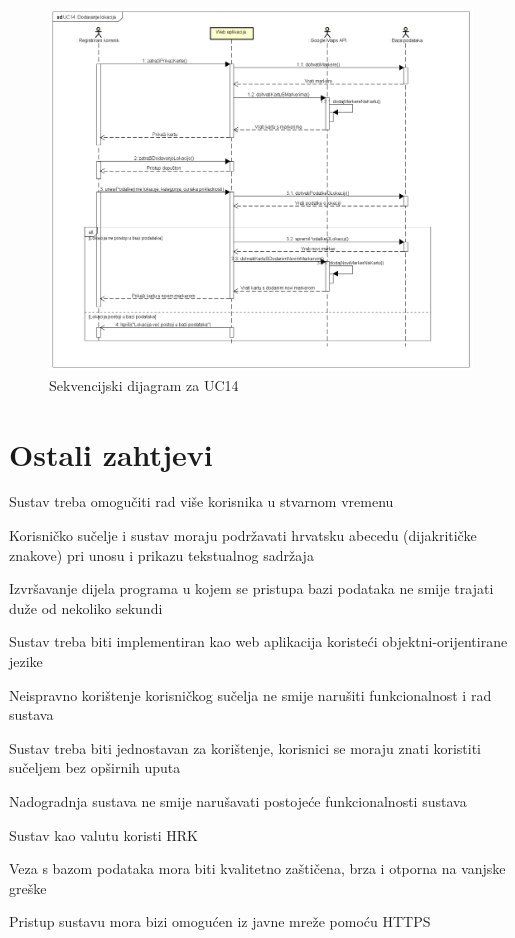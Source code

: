 				\begin{figure}[H]
					\includegraphics[scale=0.43]{slike/SekvencijskiDijagram2.png}
					\centering
					\caption{Sekvencijski dijagram za UC14}
					\label{fig:promjene}
				\end{figure}
				\eject
	
		\section{Ostali zahtjevi}
		
			\begin{packed_item}
	
        	\item  Sustav treba omogučiti rad više korisnika u stvarnom vremenu
        	\item  Korisničko sučelje i sustav moraju podržavati hrvatsku abecedu (dijakritičke znakove) pri unosu i prikazu tekstualnog sadržaja
        	\item  Izvršavanje dijela programa u kojem se pristupa bazi podataka ne smije trajati duže od nekoliko sekundi
            \item  Sustav treba biti implementiran kao web aplikacija koristeći objektni-orijentirane jezike
            \item Neispravno korištenje korisničkog sučelja ne smije narušiti funkcionalnost i rad sustava
            \item Sustav treba biti jednostavan za korištenje, korisnici se moraju znati koristiti sučeljem bez opširnih uputa
            \item Nadogradnja sustava ne smije narušavati postojeće funkcionalnosti sustava
            \item Sustav kao valutu koristi HRK
            \item Veza s bazom podataka mora biti kvalitetno zaštičena, brza i otporna na vanjske greške
            \item Pristup sustavu mora bizi omogućen iz javne mreže pomoću HTTPS
            \end{packed_item}
			 
			 
			 
	